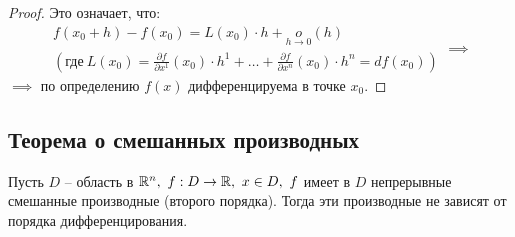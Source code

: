 \begin{proof}
    Это означает, что:
    \[
        \begin{array}{c}
            f(x_0 + h) - f(x_0) = L(x_0)\cdot h + \underset{h\rightarrow0}{o}(h) \\
            \left(\text{где} \ L(x_0) = \frac{\partial f}{\partial x^1}(x_0)\cdot h^1 + \ldots + \frac{\partial f}{\partial x^n}(x_0) \cdot h^n = df(x_0)\right)
        \end{array} \implies
    \]$\implies$ по определению $f(x)$ дифференцируема в точке $x_0$.
\end{proof}

\setcounter{subsection}{8}

\subsection{Теорема о смешанных производных}

\begin{theorem}
    Пусть $ D $ -- область в $ \mathbb{R}^n, \ f: D \rightarrow\mathbb{R}, \ x \in D, \ f $ имеет в $ D $ непрерывные смешанные производные (второго порядка). Тогда эти производные не зависят от порядка дифференцирования.
\end{theorem}


